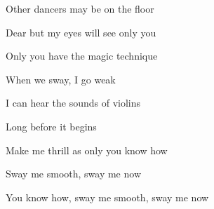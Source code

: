 \begin{song}
\bigskip

Other dancers may be on the floor \par
Dear but my eyes will see only you \par
Only you have the magic technique \par
When we sway, I go weak  \par

\bigskip

I can hear the sounds of violins \par
Long before it begins \par
Make me thrill as only you know how \par
Sway me smooth, sway me now \par

\bigskip

You know how, sway me smooth, sway me now \par

\end{song}
